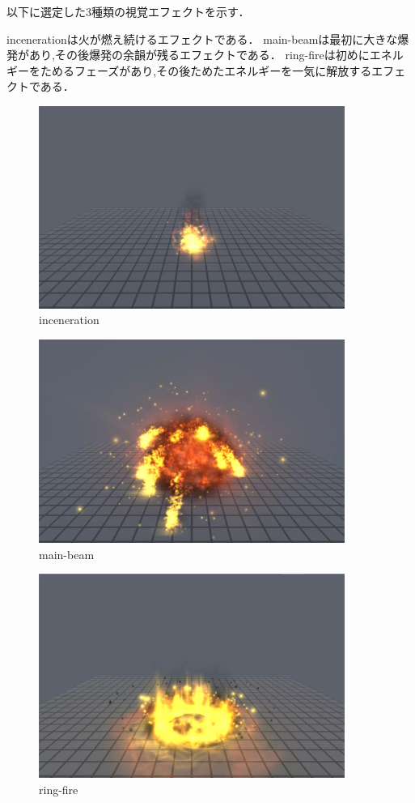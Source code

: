 以下に選定した3種類の視覚エフェクトを示す．

incenerationは火が燃え続けるエフェクトである．
main-beamは最初に大きな爆発があり,その後爆発の余韻が残るエフェクトである．
ring-fireは初めにエネルギーをためるフェーズがあり,その後ためたエネルギーを一気に解放するエフェクトである．

\begin{figure}[h]
\centering
\includegraphics[clip,width=10cm]{./fig/firefire.png}
\caption{inceneration}\label{fire}
\end{figure}

\begin{figure}[h]
\centering
\includegraphics[clip,width=10cm]{./fig/explosion.png}
\caption{main-beam}\label{explosion}
\end{figure}

\begin{figure}[h]
\centering
\includegraphics[clip,width=10cm]{./fig/ringfire.png}
\caption{ring-fire}\label{ringfire}
\end{figure}


